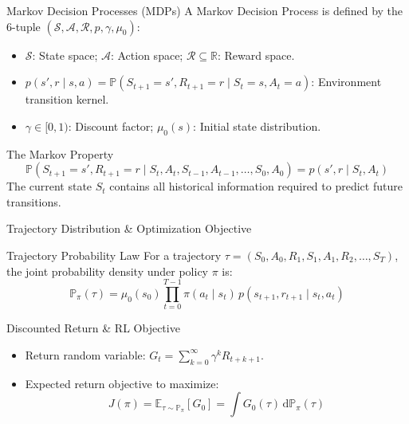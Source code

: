 \documentclass[10pt, aspectratio=169]{beamer}
\begin{document}
\begin{frame}{Markov Decision Processes (MDPs)}
  A Markov Decision Process is defined by the 6-tuple $(\mathcal{S}, \mathcal{A}, \mathcal{R}, p, \gamma, \mu_0)$:
  \begin{itemize}
    \item $\mathcal{S}$: State space; $\mathcal{A}$: Action space; $\mathcal{R} \subseteq \mathbb{R}$: Reward space.
    \item $p(s', r \mid s, a) = \mathbb{P}(S_{t+1} = s', R_{t+1} = r \mid S_t = s, A_t = a)$: Environment transition kernel.
    \item $\gamma \in [0, 1)$: Discount factor; $\mu_0(s)$: Initial state distribution.
  \end{itemize}

  \begin{block}{The Markov Property}
    $$\mathbb{P}(S_{t+1}=s', R_{t+1}=r \mid S_t, A_t, S_{t-1}, A_{t-1}, \dots, S_0, A_0) = p(s', r \mid S_t, A_t)$$
    The current state $S_t$ contains all historical information required to predict future transitions.
  \end{block}
\end{frame}

\begin{frame}{Trajectory Distribution \& Optimization Objective}
  \begin{block}{Trajectory Probability Law}
    For a trajectory $\tau = (S_0, A_0, R_1, S_1, A_1, R_2, \dots, S_T)$, the joint probability density under policy $\pi$ is:
    $$\mathbb{P}_\pi(\tau) = \mu_0(s_0) \prod_{t=0}^{T-1} \pi(a_t \mid s_t) \, p(s_{t+1}, r_{t+1} \mid s_t, a_t)$$
  \end{block}

  \begin{block}{Discounted Return \& RL Objective}
    \begin{itemize}
      \item Return random variable: $G_t = \sum_{k=0}^{\infty} \gamma^k R_{t+k+1}$.
      \item Expected return objective to maximize:
        $$J(\pi) = \mathbb{E}_{\tau \sim \mathbb{P}_\pi}[G_0] = \int G_0(\tau) \, \mathrm{d}\mathbb{P}_\pi(\tau)$$
    \end{itemize}
  \end{block}
\end{frame}
\end{document}
